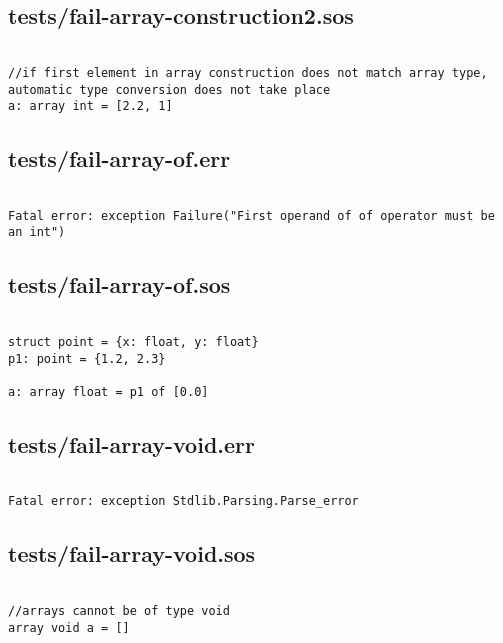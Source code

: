 \documentclass[main.tex]{subfiles}
\begin{document}
\subsection{tests/fail-array-construction2.sos}

\begin{lstlisting}

//if first element in array construction does not match array type, automatic type conversion does not take place
a: array int = [2.2, 1]
\end{lstlisting}

\subsection{tests/fail-array-of.err}

\begin{lstlisting}

Fatal error: exception Failure("First operand of of operator must be an int")
\end{lstlisting}

\subsection{tests/fail-array-of.sos}

\begin{lstlisting}

struct point = {x: float, y: float}
p1: point = {1.2, 2.3}

a: array float = p1 of [0.0]
\end{lstlisting}

\subsection{tests/fail-array-void.err}

\begin{lstlisting}

Fatal error: exception Stdlib.Parsing.Parse_error
\end{lstlisting}

\subsection{tests/fail-array-void.sos}

\begin{lstlisting}

//arrays cannot be of type void
array void a = []
\end{lstlisting}
\end{document}
